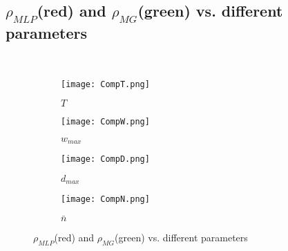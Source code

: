 \documentclass[oribibl]{llncs}
\begin{document}
\mbox{ } 

\newpage

\subsection{$\rho_{MLP}$(red) and $\rho_{MG}$(green) vs. different parameters} 
\label{subsec:Ratio}
\mbox{ }

\begin{figure*}[h]
\centering
 \begin{subfigure}{.45\textwidth}
  \centering
  \texttt{[image: CompT.png]}
  \caption{$T$}
  \label{fig:CompT}
\end{subfigure}
\hfill
 \begin{subfigure}{.45\textwidth}
  \centering
  \texttt{[image: CompW.png]}
  \caption{$w_{max}$}
  \label{fig:CompW}
\end{subfigure}

 \begin{subfigure}{.45\textwidth}
  \centering
  \texttt{[image: CompD.png]}
  \caption{$d_{max}$}
  \label{fig:CompD}
\end{subfigure}
\hfill
 \begin{subfigure}{.45\textwidth}
  \centering
  \texttt{[image: CompN.png]}
  \caption{$\bar{n}$}
  \label{fig:CompN}
\end{subfigure}

\caption{$\rho_{MLP}$(red) and $\rho_{MG}$(green) vs. different parameters}
\label{fig:COMP}
\end{figure*}

\mbox{}
\end{document}
